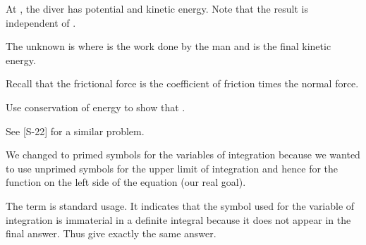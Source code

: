 {
{At , the diver has potential and kinetic energy.
Note that the result is independent of \m{\theta}.
}

{The unknown is  where  is the work done by the man and
 is the final kinetic energy.
}

{Recall that the frictional force is the coefficient of friction times
the normal force.
}

{Use conservation of energy to show that .
}

{See [S-22] for a similar problem.
}

{We changed to primed symbols for the variables of integration because we
 wanted to use unprimed symbols for the upper limit of integration and
 hence for the function on the left side of the equation (our real goal).

 The term  is standard usage.
 It indicates that the symbol used for the variable of integration is
 immaterial in a definite integral because it does not appear in the final
 answer.
 Thus
 give exactly the same answer.
}

}%
